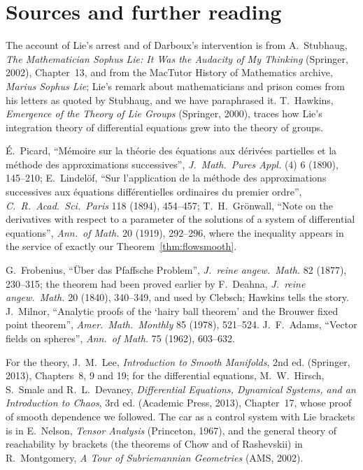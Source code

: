\section*{Sources and further reading}

The account of Lie's arrest and of Darboux's intervention is from A.~Stubhaug, \emph{The Mathematician Sophus Lie: It Was the Audacity of My Thinking}
(Springer, 2002), Chapter~13, and from the MacTutor History of Mathematics archive, \emph{Marius Sophus Lie}; Lie's remark about mathematicians and
prison comes from his letters as quoted by Stubhaug, and we have paraphrased it. T.~Hawkins, \emph{Emergence of the Theory of Lie Groups} (Springer, 2000), traces how Lie's
integration theory of differential equations grew into the theory of groups.

\'E.~Picard, ``M\'emoire sur la th\'eorie des \'equations aux d\'eriv\'ees partielles et la m\'ethode des approximations successives'', \emph{J.\ Math.\
Pures Appl.} (4) 6 (1890), 145--210; E.~Lindel\"of, ``Sur l'application de la m\'ethode des approximations successives aux \'equations diff\'erentielles
ordinaires du premier ordre'', \emph{C.\ R.\ Acad.\ Sci.\ Paris} 118 (1894), 454--457; T.~H.~Gr\"onwall, ``Note on the derivatives with respect to a
parameter of the solutions of a system of differential equations'', \emph{Ann.\ of Math.} 20 (1919), 292--296, where the inequality appears in the service
of exactly our Theorem~\ref{thm:flowsmooth}.

G.~Frobenius, ``\"Uber das Pfaffsche Problem'', \emph{J.\ reine angew.\ Math.} 82 (1877), 230--315; the theorem had been proved earlier by F.~Deahna,
\emph{J.\ reine angew.\ Math.} 20 (1840), 340--349, and used by Clebsch; Hawkins tells the story. J.~Milnor, ``Analytic proofs of the `hairy ball theorem'
and the Brouwer fixed point theorem'', \emph{Amer.\ Math.\ Monthly} 85 (1978), 521--524. J.~F.~Adams, ``Vector fields on spheres'', \emph{Ann.\ of Math.}
75 (1962), 603--632.

For the theory, J.~M.~Lee, \emph{Introduction to Smooth Manifolds}, 2nd ed. (Springer, 2013), Chapters~8, 9 and 19; for the differential equations,
M.~W.~Hirsch, S.~Smale and R.~L.~Devaney, \emph{Differential Equations, Dynamical Systems, and an Introduction to Chaos}, 3rd ed. (Academic Press, 2013),
Chapter~17, whose proof of smooth dependence we followed. The car as a control system with Lie brackets is in E.~Nelson, \emph{Tensor Analysis}
(Princeton, 1967), and the general theory of reachability by brackets (the theorems of Chow and of Rashevskii) in R.~Montgomery, \emph{A Tour of
Subriemannian Geometries} (AMS, 2002).
